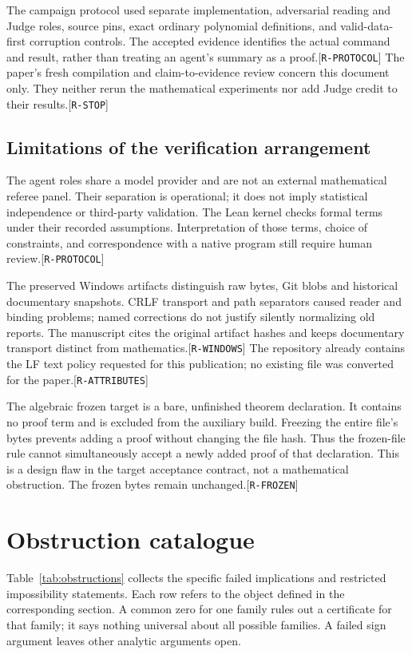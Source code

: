 \documentclass[11pt]{article}
\newcommand{\ev}[1]{{\scriptsize[\nolinkurl{#1}]}}
\theoremstyle{remark}
\begin{document}
The campaign protocol used separate implementation, adversarial reading and
Judge roles, source pins, exact ordinary polynomial definitions, and
valid-data-first corruption controls. The accepted evidence identifies the
actual command and result, rather than treating an agent's summary as a
proof.\ev{R-PROTOCOL}
The paper's fresh compilation and claim-to-evidence review concern this
document only. They neither rerun the mathematical experiments nor add
Judge credit to their results.\ev{R-STOP}

\subsection{Limitations of the verification arrangement}
The agent roles share a model provider and are not an external mathematical
referee panel. Their separation is operational; it does not imply
statistical independence or third-party validation. The Lean kernel checks
formal terms under their recorded assumptions. Interpretation of those
terms, choice of constraints, and correspondence with a native program
still require human review.\ev{R-PROTOCOL}

The preserved Windows artifacts distinguish raw bytes, Git blobs and
historical documentary snapshots. CRLF transport and path separators caused
reader and binding problems; named corrections do not justify silently
normalizing old reports. The manuscript cites the original artifact hashes
and keeps documentary transport distinct from mathematics.\ev{R-WINDOWS}
The repository already contains the LF text policy requested for this
publication; no existing file was converted for the paper.\ev{R-ATTRIBUTES}

The algebraic frozen target is a bare, unfinished theorem declaration. It
contains no proof term and is excluded from the auxiliary build. Freezing
the entire file's bytes prevents adding a proof without changing the file
hash. Thus the frozen-file rule cannot simultaneously accept a newly added
proof of that declaration. This is a design flaw in the target acceptance
contract, not a mathematical obstruction. The frozen bytes remain
unchanged.\ev{R-FROZEN}





\section{Obstruction catalogue}
Table~\ref{tab:obstructions} collects the specific failed implications and
restricted impossibility statements. Each row refers to the object defined
in the corresponding section. A common zero for one family rules out a
certificate for that family; it says nothing universal about all possible
families. A failed sign argument leaves other analytic arguments open.
\end{document}
